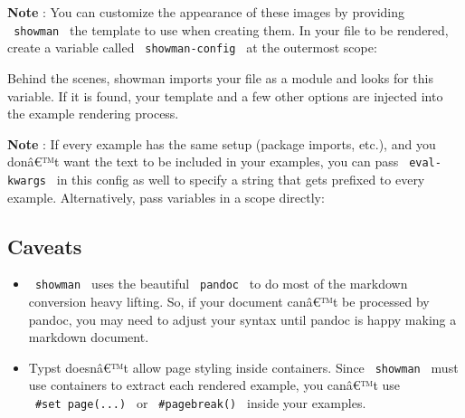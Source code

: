 \textbf{Note} : You can customize the appearance of these images by
providing \texttt{\ showman\ } the template to use when creating them.
In your file to be rendered, create a variable called
\texttt{\ showman-config\ } at the outermost scope:

\begin{Shaded}
\begin{Highlighting}[]
\NormalTok{  \}}
\NormalTok{)}
\end{Highlighting}
\end{Shaded}

Behind the scenes, showman imports your file as a module and looks for
this variable. If it is found, your template and a few other options are
injected into the example rendering process.

\textbf{Note} : If every example has the same setup (package imports,
etc.), and you donâ€™t want the text to be included in your examples,
you can pass \texttt{\ eval-kwargs\ } in this config as well to specify
a string that gets prefixed to every example. Alternatively, pass
variables in a scope directly:

\begin{Shaded}
\begin{Highlighting}[]
\NormalTok{  ),}
\NormalTok{)}
\end{Highlighting}
\end{Shaded}

\subsection{Caveats}\label{caveats}

\begin{itemize}
\item
  \texttt{\ showman\ } uses the beautiful \texttt{\ pandoc\ } to do most
  of the markdown conversion heavy lifting. So, if your document canâ€™t
  be processed by pandoc, you may need to adjust your syntax until
  pandoc is happy making a markdown document.
\item
  Typst doesnâ€™t allow page styling inside containers. Since
  \texttt{\ showman\ } must use containers to extract each rendered
  example, you canâ€™t use \texttt{\ \#set\ page(...)\ } or
  \texttt{\ \#pagebreak()\ } inside your examples.
\end{itemize}

